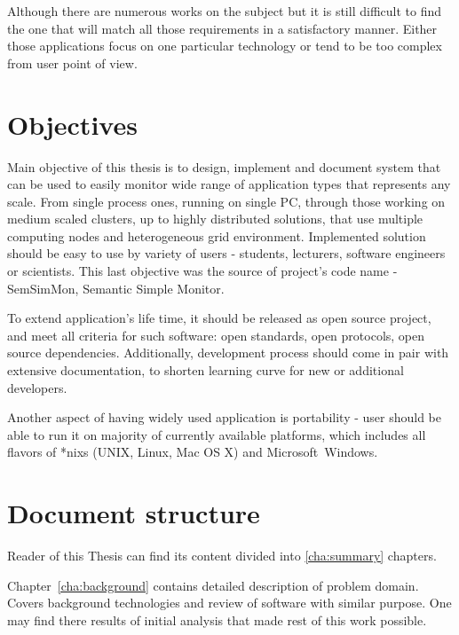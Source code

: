 Although there are numerous works on the subject but it is still difficult to find the one that will match all those requirements in a satisfactory manner. Either those applications focus on one particular technology or tend to be too complex from user point of view. 


\section{Objectives}
\label{ch1:Objectives}
Main objective of this thesis is to design, implement and document system that can be used to easily monitor wide range of application types that represents any scale. From single process ones, running on single PC, through those working on medium scaled clusters, up to highly distributed solutions, that use multiple computing nodes and heterogeneous grid environment. Implemented solution should be easy to use by variety of users - students, lecturers, software engineers or scientists. This last objective was the source of project's code name - SemSimMon, Semantic Simple Monitor. 

To extend application's life time, it should be released as open source project, and meet all criteria for such software: open standards, open protocols, open source dependencies. Additionally, development process should come in pair with extensive documentation, to shorten learning curve for new or additional developers.

Another aspect of having widely used application is portability - user should be able to run it on majority of currently available platforms, which includes all flavors of *nixs (UNIX, Linux, Mac OS X\textregistered) and Microsoft\textregistered~Windows\textregistered. 

\section{Document structure}
\label{ch1:docStructure}

Reader of this Thesis can find its content divided into \ref{cha:summary} chapters. 

Chapter~\ref{cha:background} contains detailed description of problem domain. Covers background technologies and review of software with similar purpose. One may find there results of initial analysis that made rest of this work possible.

